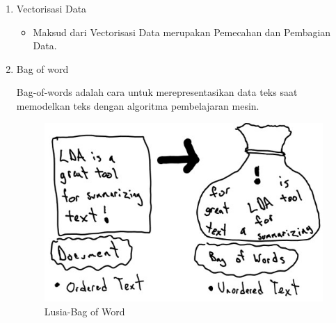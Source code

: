 \begin{enumerate}
\item Vectorisasi Data
	\begin{itemize}
		\item Maksud dari Vectorisasi Data merupakan Pemecahan dan Pembagian Data.
	\end{itemize}
	
\item Bag of word
	\par Bag-of-words adalah cara untuk merepresentasikan data teks saat memodelkan teks dengan algoritma pembelajaran mesin.
	\begin{figure}[ht]
		\centering
		\includegraphics[scale=0.5]{figures/m5.jpg}
		\caption{Lusia-Bag of Word}
		\label{contoh}
	\end{figure}
	

\end{enumerate}
